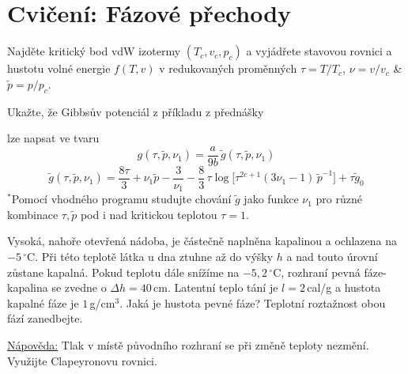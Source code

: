 \section{Cvičení: Fázové přechody}

\begin{priklad}[Příklad 1]
Najděte kritický bod vdW izotermy $(T_c, v_c, p_c)$ a vyjádřete stavovou rovnici a hustotu volné energie $f(T,v)$
v redukovaných proměnných $\tau = T/T_c$, $\nu = v/v_c$ \& $\tilde p = p/p_c$.
\end{priklad}

\begin{priklad}[Příklad 2]
Ukažte, že Gibbsův potenciál z příkladu z přednášky
\begin{center}
\end{center}
lze napsat ve tvaru
\[
  g(\tau,\tilde p,\nu_1) = \frac{a}{9b}\,\tilde g(\tau,\tilde p,\nu_1)
\]
\[
  \tilde g(\tau,\tilde p,\nu_1) = \frac{8\tau}{3} + \nu_1\tilde p - \frac{3}{\nu_1}
  - \frac83\,\tau\log\!\Big[\tau^{2c+1}(3\nu_1 - 1)\,\tilde p^{-1}\Big] + \tau\tilde g_0
\]
$^*$Pomocí vhodného programu studujte chování $\tilde g$ jako funkce $\nu_1$ pro různé kombinace $\tau, \tilde p$ pod i nad kritickou teplotou $\tau = 1$.
\end{priklad}

\begin{priklad}[Příklad 3$^*$]
Vysoká, nahoře otevřená nádoba, je částečně naplněna kapalinou a ochlazena na $-5\,^\circ$C. Při této teplotě látka u dna ztuhne
až do výšky $h$ a nad touto úrovní zůstane kapalná. Pokud teplotu dále snížíme na $-5{,}2\,^\circ$C, rozhraní pevná fáze-kapalina
se zvedne o $\Delta h = 40$\,cm. Latentní teplo tání je $l = 2$\,cal/g a hustota kapalné fáze je $1$\,g/cm$^3$. Jaká je hustota
pevné fáze? Teplotní roztažnost obou fází zanedbejte.

\underline{Nápověda:} Tlak v místě původního rozhraní se při změně teploty nezmění. Využijte Clapeyronovu rovnici.
\end{priklad}

